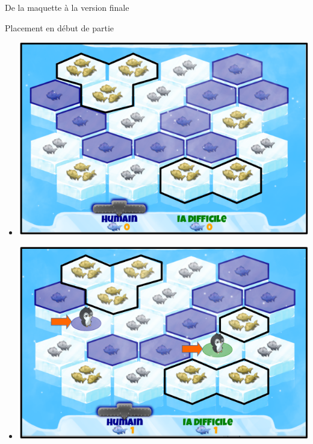 \documentclass{beamer}
\begin{document}
\begin{frame}{De la maquette à la version finale}
\begin{frame}{}
\begin{block}{Placement en début de partie}
\begin{itemize}
 \item<1->\includegraphics[scale=0.2]{IA1}
 \item<2->\includegraphics[scale=0.2]{IA2}
\end{itemize}
\end{block}
\end{frame}


\end{frame}
\end{document}
